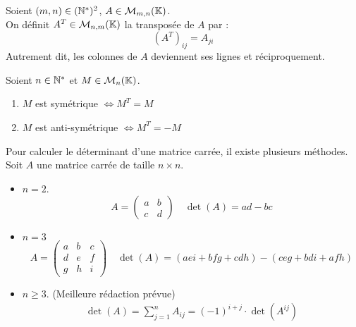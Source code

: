 \begin{definition}[Transposée]
	Soient $(m,n) \in (\mathbb{N}^*)^2$, $A \in \mathcal{M}_{m, n}(\mathbb{K})$.
	\\
	On définit $A^T \in \mathcal{M}_{n, m}(\mathbb{K})$ la transposée de $A$ par :
	\[(A^T)_{ij} = A_{ji}\]
    Autrement dit, les colonnes de $A$ deviennent ses lignes et réciproquement.
\end{definition}

\begin{definition}
	Soient $n \in \mathbb{N}^*$ et $M \in \mathcal{M}_n(\mathbb{K})$.
	\begin{multicols}{2}
	    \begin{enumerate}
    		\item $M$ est symétrique $\iff M^T = M$
    		\item $M$ est anti-symétrique $\iff M^T = -M$
    	\end{enumerate}
	\end{multicols}
\end{definition}

\begin{proposition}
    Pour calculer le déterminant d'une matrice carrée, il existe plusieurs méthodes.
    Soit $A$ une matrice carrée de taille $n \times n$. 
    \begin{itemize}
        \item $n = 2$. 
        \[ 
        A = 
        \begin{pmatrix}
            a & b \\
            c & d
        \end{pmatrix}
        \quad 
        \det(A) = ad - bc 
        \]
        \item $n = 3$
        \[
        A = 
        \begin{pmatrix}
            a & b & c \\
            d & e & f \\
            g & h & i
        \end{pmatrix}
        \quad 
        \det(A) = (aei + bfg + cdh) - (ceg + bdi + afh)
        \]
        \item $n \geq 3$.
        (Meilleure rédaction prévue)
        \begin{align*}
            \det(A) = \sum_{j = 1}^{n} A_{ij} = (-1)^{i+j} \cdot \det(A^{ij})
        \end{align*}
    \end{itemize}
\end{proposition}


